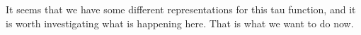 \documentclass[a4paper,11pt]{amsart}
\begin{document}
It seems that we have some different representations for this tau function, 
and it is worth investigating what is happening here. That is what we want 
to do now. 


%
%
%
%
%
%
%
%
%

\printbibliography
\end{document}
